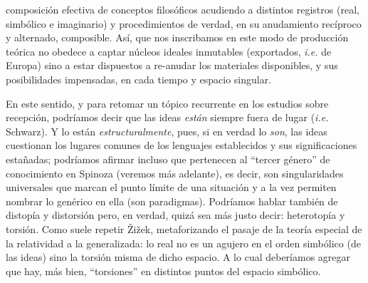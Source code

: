 composición efectiva de conceptos filosóficos acudiendo a distintos registros (real, simbólico e imaginario) y procedimientos de verdad, en su anudamiento recíproco y alternado, composible. Así, que nos inscribamos en este modo de producción teórica no obedece a captar núcleos ideales inmutables (exportados, \emph{i.e.} de Europa) sino a estar dispuestos a re-anudar los materiales disponibles, y sus posibilidades impensadas, en cada tiempo y espacio singular.

En este sentido, y para retomar un tópico recurrente en los estudios sobre recepción, podríamos decir que las ideas \emph{están} siempre fuera de lugar (\emph{i.e.} Schwarz). Y lo están \emph{estructuralmente}, pues, si en verdad lo \emph{son}, las ideas cuestionan los lugares comunes de los lenguajes establecidos y sus significaciones estañadas; podríamos afirmar incluso que pertenecen al \enquote{tercer género} de conocimiento en Spinoza (veremos más adelante), es decir, son singularidades universales que marcan el punto límite de una situación y a la vez permiten nombrar lo genérico en ella (son paradigmas). Podríamos hablar también de distopía y distorsión pero, en verdad, quizá sea más justo decir: heterotopía y torsión. Como suele repetir Žižek, metaforizando el pasaje de la teoría especial de la relatividad a la generalizada: lo real no es un agujero en el orden simbólico (de las ideas) sino la torsión misma de dicho espacio. A lo cual deberíamos agregar que hay, más bien, \enquote{torsiones} en distintos puntos del espacio simbólico.

